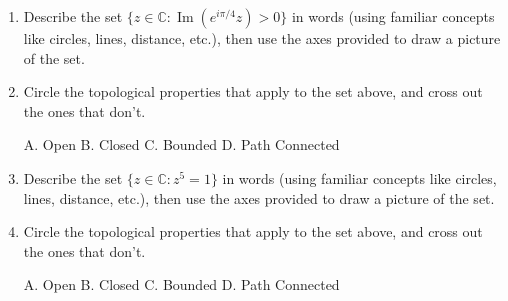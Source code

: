 \documentclass[11pt]{article}
\newcommand{\C}{\mathbb{C}}
\newcommand{\im}{\operatorname{Im}}
\begin{document}
\begin{enumerate}
\item Describe the set $\{z\in \C : \im \left( e^{i \pi/4} z \right) > 0 \}$ in words (using familiar concepts like circles, lines, distance, etc.), then use the axes provided to draw a picture of the set.  \\
\begin{flushright}
\end{flushright}


\item Circle the topological properties that apply to the set above, and cross out the ones that don't.
\begin{center}
A. Open \hspace*{0.4in} B. Closed \hspace*{0.4in} C. Bounded \hspace*{0.4in} D. Path Connected
\end{center}
\vspace*{0.15in}

\newpage
\item Describe the set $\{z \in \C : z^5 = 1 \}$ in words (using familiar concepts like circles, lines, distance, etc.), then use the axes provided to draw a picture of the set.  \\
\begin{flushright}
\end{flushright}


\item Circle the topological properties that apply to the set above, and cross out the ones that don't.
\begin{center}
A. Open \hspace*{0.4in} B. Closed \hspace*{0.4in} C. Bounded \hspace*{0.4in} D. Path Connected
\end{center}
\vspace*{0.25in}
\setcounter{enumCount}{\theenumi}
\end{enumerate}

\end{document}
